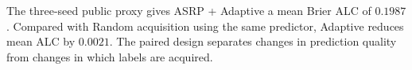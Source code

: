 The three-seed public proxy gives ASRP + Adaptive a mean Brier ALC of $0.1987$. Compared with Random acquisition using the same predictor, Adaptive reduces mean ALC by $0.0021$. The paired design separates changes in prediction quality from changes in which labels are acquired.
